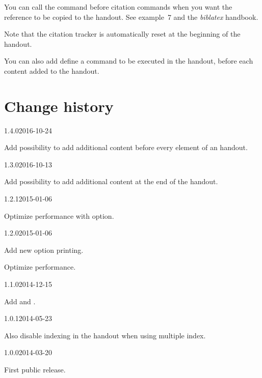 \documentclass{ltxdockit}[2011/03/25]
\begin{document}
You can call the  command before citation commands when you want the reference to be copied to the handout. See example~7 and the \emph{biblatex} handbook.


Note that the citation tracker is automatically reset at the beginning of the handout.

You can also add define a  command to be executed in the handout, before each content added to the handout.
\section{Change history}

\begin{changelog}

\begin{release}{1.4.0}{2016-10-24}
\item Add possibility to add additional content before every element of an handout.
\end{release}

\begin{release}{1.3.0}{2016-10-13}
\item Add possibility to add additional content at the end of the handout. 
\end{release}

\begin{release}{1.2.1}{2015-01-06}
\item Optimize performance with  option.
\end{release}

\begin{release}{1.2.0}{2015-01-06}
\item Add new option printing. 
\item Optimize performance.
\end{release}

\begin{release}{1.1.0}{2014-12-15}
\item Add  and . 
\end{release}

\begin{release}{1.0.1}{2014-05-23}
\item Also disable indexing in the handout when using multiple index.
\end{release}

\begin{release}{1.0.0}{2014-03-20}
\item First public release.
\end{release}
\end{changelog}
\end{document}
